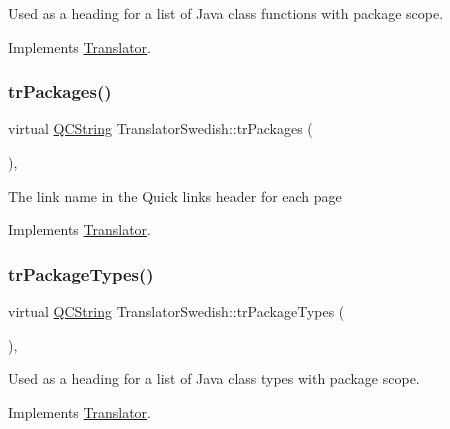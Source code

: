 Used as a heading for a list of Java class functions with package scope. 

Implements \mbox{\hyperlink{class_translator}{Translator}}.

\mbox{\label{class_translator_swedish_ac8c65bd19bd45d313b20162bde8b1f2b}} 
\subsubsection{\texorpdfstring{trPackages()}{trPackages()}}
{\footnotesize\ttfamily virtual \mbox{\hyperlink{class_q_c_string}{Q\+C\+String}} Translator\+Swedish\+::tr\+Packages (\begin{DoxyParamCaption}{ }\end{DoxyParamCaption})\hspace{0.3cm}{\ttfamily [inline]}, {\ttfamily [virtual]}}

The link name in the Quick links header for each page 

Implements \mbox{\hyperlink{class_translator}{Translator}}.

\mbox{\label{class_translator_swedish_aaeb3a2b83ba4af2f9d108d2fcb2f0a6f}} 
\subsubsection{\texorpdfstring{trPackageTypes()}{trPackageTypes()}}
{\footnotesize\ttfamily virtual \mbox{\hyperlink{class_q_c_string}{Q\+C\+String}} Translator\+Swedish\+::tr\+Package\+Types (\begin{DoxyParamCaption}{ }\end{DoxyParamCaption})\hspace{0.3cm}{\ttfamily [inline]}, {\ttfamily [virtual]}}

Used as a heading for a list of Java class types with package scope. 

Implements \mbox{\hyperlink{class_translator}{Translator}}.

\mbox{\label{class_translator_swedish_ab22c79420022d4e97411fed16c34fe01}} 
